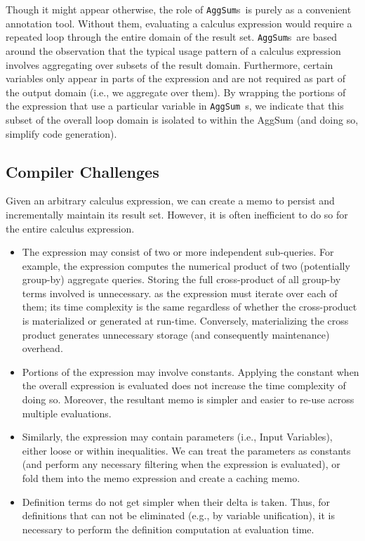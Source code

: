 \documentclass[11pt]{amsart}
\newcommand{\parsection}[1]{\smallskip\noindent{\bf #1.}}
\newcommand{\AggSum}{{\tt AggSum}\ }
\newcommand{\AggSums}{{\tt AggSum}s\ }
\begin{document}
\parsection{The (ir)relevance of \AggSum s}
Though it might appear otherwise, the role of \AggSums is purely as a convenient annotation tool.  Without them, evaluating a calculus expression would require a repeated loop through the entire domain of the result set.  \AggSums are based around the observation that the typical usage pattern of a calculus expression involves aggregating over subsets of the result domain.  Furthermore, certain variables only appear in parts of the expression and are not required as part of the output domain (i.e., we aggregate over them).  By wrapping the portions of the expression that use a particular variable in \AggSum s, we indicate that this subset of the overall loop domain is isolated to within the {AggSum} (and doing so, simplify code generation).

\subsection{Compiler Challenges}

\parsection{Extraction}
Given an arbitrary calculus expression, we can create a memo to persist and incrementally maintain its result set.  However, it is often inefficient to do so for the entire calculus expression.  

\begin{itemize}
\item The expression may consist of two or more independent sub-queries.  For example, the expression computes the numerical product of two (potentially group-by) aggregate queries.  Storing the full cross-product of all group-by terms involved is unnecessary. as the expression must iterate over each of them; its time complexity is the same regardless of whether the cross-product is materialized or generated at run-time.  Conversely, materializing the cross product generates unnecessary storage (and consequently maintenance) overhead. 
 
\item Portions of the expression may involve constants.  Applying the constant when the overall expression is evaluated does not increase the time complexity of doing so.  Moreover, the resultant memo is simpler and easier to re-use across multiple evaluations.

\item Similarly, the expression may contain parameters (i.e., Input Variables), either loose or within inequalities.  We can treat the parameters as constants (and perform any necessary filtering when the expression is evaluated), or fold them into the memo expression and create a caching memo.

\item Definition terms do not get simpler when their delta is taken.  Thus, for definitions that can not be eliminated (e.g., by variable unification), it is necessary to perform the definition computation at evaluation time.  
\end{itemize}
\end{document}
